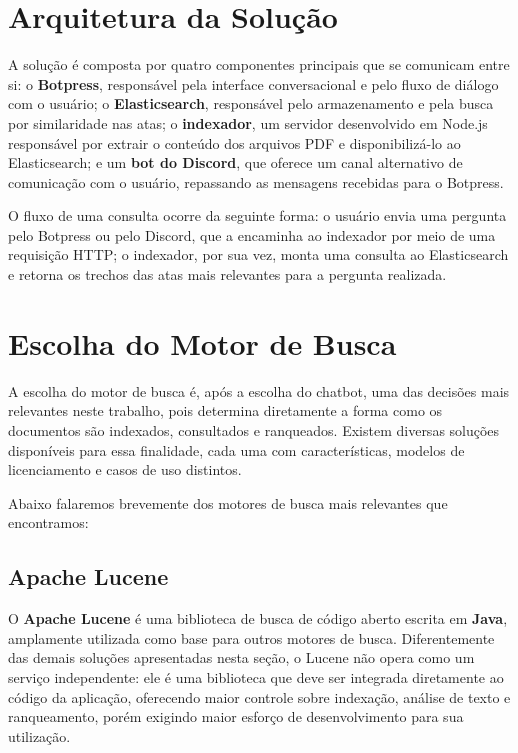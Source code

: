 \section{Arquitetura da Solução}\label{sec:arquitetura-solucao}

A solução é composta por quatro componentes principais que se comunicam entre si: o \textbf{Botpress}, responsável pela interface conversacional e pelo fluxo de diálogo com o usuário; o \textbf{Elasticsearch}, responsável pelo armazenamento e pela busca por similaridade nas atas; o \textbf{indexador}, um servidor desenvolvido em Node.js responsável por extrair o conteúdo dos arquivos PDF e disponibilizá-lo ao Elasticsearch; e um \textbf{bot do Discord}, que oferece um canal alternativo de comunicação com o usuário, repassando as mensagens recebidas para o Botpress.

O fluxo de uma consulta ocorre da seguinte forma: o usuário envia uma pergunta pelo Botpress ou pelo Discord, que a encaminha ao indexador por meio de uma requisição HTTP; o indexador, por sua vez, monta uma consulta ao Elasticsearch e retorna os trechos das atas mais relevantes para a pergunta realizada.

\section{Escolha do Motor de Busca}\label{sec:motor-busca}

A escolha do motor de busca é, após a escolha do chatbot, uma das decisões mais relevantes neste trabalho, pois determina diretamente a forma como os documentos são indexados, consultados e ranqueados. Existem diversas soluções disponíveis para essa finalidade, cada uma com características, modelos de licenciamento e casos de uso distintos.

Abaixo falaremos brevemente dos motores de busca mais relevantes que encontramos:

\subsection{Apache Lucene}

O \textbf{Apache Lucene} \cite{lucene-docs} é uma biblioteca de busca de código aberto escrita em \textbf{Java}, amplamente utilizada como base para outros motores de busca. Diferentemente das demais soluções apresentadas nesta seção, o Lucene não opera como um serviço independente: ele é uma biblioteca que deve ser integrada diretamente ao código da aplicação, oferecendo maior controle sobre indexação, análise de texto e ranqueamento, porém exigindo maior esforço de desenvolvimento para sua utilização.

